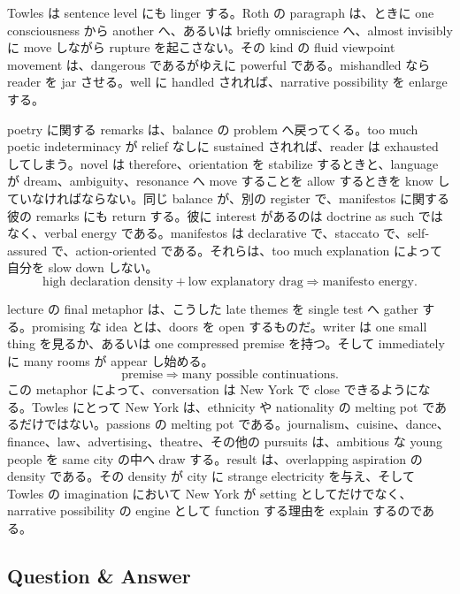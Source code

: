 Towles は sentence level にも linger する。Roth の paragraph は、ときに one consciousness から another へ、あるいは briefly omniscience へ、almost invisibly に move しながら rupture を起こさない。その kind の fluid viewpoint movement は、dangerous であるがゆえに powerful である。mishandled なら reader を jar させる。well に handled されれば、narrative possibility を enlarge する。

poetry に関する remarks は、balance の problem へ戻ってくる。too much poetic indeterminacy が relief なしに sustained されれば、reader は exhausted してしまう。novel は therefore、orientation を stabilize するときと、language が dream、ambiguity、resonance へ move することを allow するときを know していなければならない。同じ balance が、別の register で、manifestos に関する彼の remarks にも return する。彼に interest があるのは doctrine as such ではなく、verbal energy である。manifestos は declarative で、staccato で、self-assured で、action-oriented である。それらは、too much explanation によって自分を slow down しない。
\begin{equation}
\text{high declaration density} + \text{low explanatory drag} \Rightarrow \text{manifesto energy}.
\end{equation}

lecture の final metaphor は、こうした late themes を single test へ gather する。promising な idea とは、doors を open するものだ。writer は one small thing を見るか、あるいは one compressed premise を持つ。そして immediately に many rooms が appear し始める。
\begin{equation}
\text{premise} \Rightarrow \text{many possible continuations}.
\end{equation}
この metaphor によって、conversation は New York で close できるようになる。Towles にとって New York は、ethnicity や nationality の melting pot であるだけではない。passions の melting pot である。journalism、cuisine、dance、finance、law、advertising、theatre、その他の pursuits は、ambitious な young people を same city の中へ draw する。result は、overlapping aspiration の density である。その density が city に strange electricity を与え、そして Towles の imagination において New York が setting としてだけでなく、narrative possibility の engine として function する理由を explain するのである。

\subsection{Question \& Answer}

